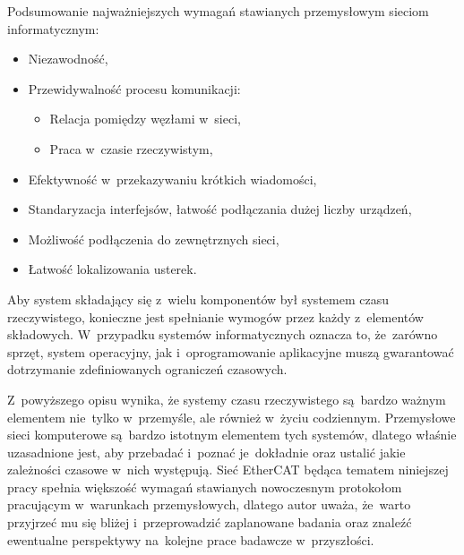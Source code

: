 Podsumowanie najważniejszych wymagań stawianych przemysłowym sieciom informatycznym:
\begin{itemize}
\item Niezawodność,
\item Przewidywalność procesu komunikacji:
\begin{itemize}
\item Relacja pomiędzy węzłami w~sieci,
\item Praca w~czasie rzeczywistym,
\end{itemize}
\item Efektywność w~przekazywaniu krótkich wiadomości,
\item Standaryzacja interfejsów, łatwość podłączania dużej liczby urządzeń,
\item Możliwość podłączenia do zewnętrznych sieci,
\item Łatwość lokalizowania usterek.
\end{itemize}

Aby system składający się z~wielu komponentów był systemem czasu rzeczywistego, konieczne jest spełnianie wymogów przez każdy z~elementów składowych. W~przypadku systemów informatycznych oznacza to, że~zarówno sprzęt, system operacyjny, jak i~oprogramowanie aplikacyjne muszą gwarantować dotrzymanie zdefiniowanych ograniczeń czasowych.

Z~powyższego opisu wynika, że systemy czasu rzeczywistego są~bardzo ważnym elementem nie~tylko w~przemyśle, ale również w~życiu codziennym. Przemysłowe sieci komputerowe są~bardzo istotnym elementem tych systemów, dlatego właśnie uzasadnione jest, aby przebadać i~poznać je~dokładnie oraz ustalić jakie zależności czasowe w~nich występują.
Sieć EtherCAT będąca tematem niniejszej pracy spełnia większość wymagań stawianych nowoczesnym protokołom pracującym w~warunkach przemysłowych, dlatego autor uważa, że~warto przyjrzeć mu się bliżej i~przeprowadzić zaplanowane badania oraz znaleźć ewentualne perspektywy na~kolejne prace badawcze w~przyszłości.
\clearpage
